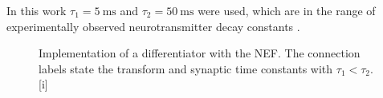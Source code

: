 In this work $\tau_1 = \SI{5}{\milli\second}$ and $\tau_2 = \SI{50}{\milli\second}$ were used, which are in the range of experimentally observed neurotransmitter decay constants \parencite{sah1990-1,moreno-bote2005}.
\begin{figure}
    \begin{captionbeside}{Implementation of a differentiator with the NEF\@. The connection labels state the transform and synaptic time constants with $\tau_1 < \tau_2$.\label{fig:differentiator-net}}[i]
    \end{captionbeside}
\end{figure}


